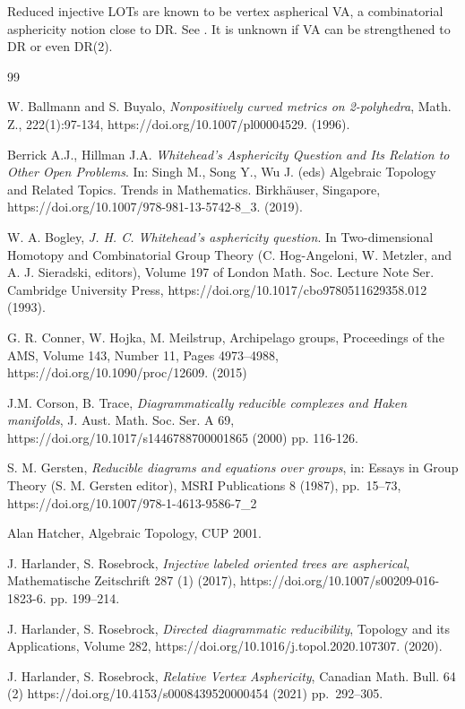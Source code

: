 \documentclass[12pt]{amsart}
\theoremstyle{definition}
\begin{document}
Reduced injective LOTs are known to be vertex aspherical VA, a combinatorial asphericity notion close to DR. See \cite{HarRose2020}. It is unknown if VA can be strengthened to DR or even DR(2). 

\begin{thebibliography}{99}

 W. Ballmann and S. Buyalo, {\em Nonpositively curved metrics on 2-polyhedra}, Math. Z., 222(1):97-134,  https://doi.org/10.1007/pl00004529.  (1996).

 Berrick A.J., Hillman J.A.  {\em Whitehead's Asphericity Question and Its Relation to Other Open Problems}. In: Singh M., Song Y., Wu J. (eds) Algebraic Topology and Related Topics. Trends in Mathematics. Birkh\"auser, Singapore, https://doi.org/10.1007/978-981-13-5742-8\_3. (2019).

 W. A. Bogley, {\em J. H. C. Whitehead's asphericity question}. In 
Two-dimensional Homotopy and Combinatorial Group Theory (C. Hog-Angeloni, W. Metzler, and A. J. Sieradski, editors), Volume 197 of London Math. Soc. Lecture Note Ser. Cambridge University Press,  https://doi.org/10.1017/cbo9780511629358.012 (1993).

G. R. Conner, W.  Hojka, M.  Meilstrup, Archipelago groups, Proceedings of the AMS,
Volume 143, Number 11, Pages 4973–4988,  https://doi.org/10.1090/proc/12609. (2015)

 J.M. Corson, B. Trace, {\em Diagrammatically reducible complexes and Haken manifolds}, J. Aust. Math. Soc. Ser. A 69,  https://doi.org/10.1017/s1446788700001865  (2000)
pp. 116-126.

 S. M. Gersten, {\it Reducible diagrams and equations over groups},
in: Essays in Group Theory (S. M. Gersten editor), MSRI Publications 8 (1987), pp.~15--73,
 https://doi.org/10.1007/978-1-4613-9586-7\_2 

 Alan Hatcher, Algebraic Topology, CUP 2001.

 J. Harlander, S. Rosebrock, {\em Injective labeled oriented trees are aspherical}, Mathematische Zeitschrift 287 (1) (2017),
 https://doi.org/10.1007/s00209-016-1823-6.  pp. 199--214.

 J. Harlander, S. Rosebrock,
{\em Directed diagrammatic reducibility}, Topology and its Applications,
Volume 282,  https://doi.org/10.1016/j.topol.2020.107307. (2020).

J. Harlander, S. Rosebrock, {\em Relative Vertex Asphericity}, Canadian Math. Bull. 64 (2)  https://doi.org/10.4153/s0008439520000454  (2021) pp.~292--305.


\end{thebibliography}
\end{document}
